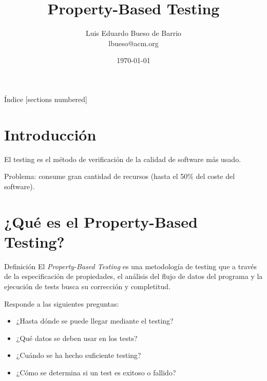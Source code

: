 \documentclass[10pt]{beamer}
\title{Property-Based Testing}
\date{\today}
\author{
  Luis Eduardo Bueso de Barrio\\
  lbueso@acm.org
}
\institute{ACM PLIG}
\begin{document}
\nocite{*}

\maketitle

\begin{frame}{Índice}
  [sections numbered]
  \tableofcontents[hideallsubsections]
\end{frame}

\section{Introducción}

\begin{frame}                   %
  El testing es el método de verificación de la calidad de software
  más usado.

  Problema: consume gran cantidad de recursos (hasta el 50\% del coste
  del software).

\end{frame}

\section{¿Qué es el Property-Based Testing?}

\begin{frame}{Definición}
  El \textit{Property-Based Testing} es una metodología de testing que
  a través de la especificación de propiedades, el análisis del flujo
  de datos del programa y la ejecución de tests busca su corrección y
  completitud.

  Responde a las siguientes preguntas:
  \begin{itemize}
  \item ¿Hasta dónde se puede llegar mediante el testing?
  \item ¿Qué datos se deben usar en los tests?
  \item ¿Cuándo se ha hecho suficiente testing?
  \item ¿Cómo se determina si un test es exitoso o fallido?
  \end{itemize}

\end{frame}
\end{document}
